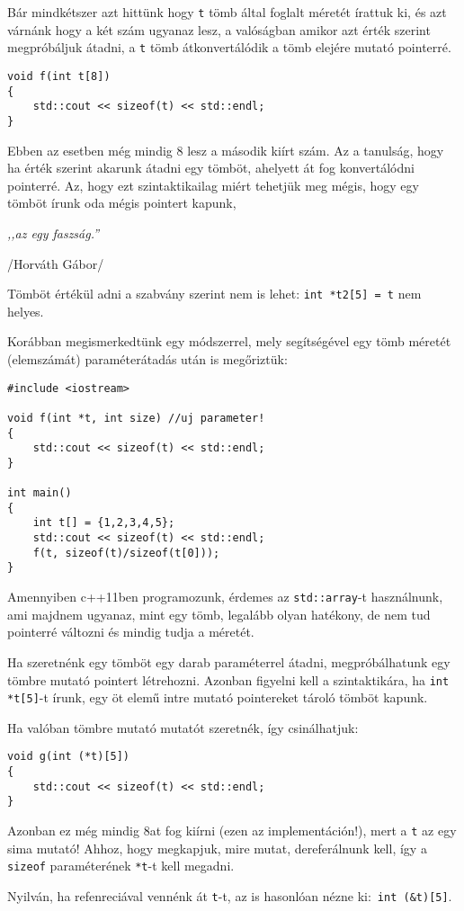 \documentclass[a4paper,11.5pt,table]{article}
\begin{document}
	Bár mindkétszer azt hittünk hogy \texttt{t} tömb által foglalt méretét írattuk ki, és azt várnánk hogy a két szám ugyanaz lesz, a valóságban amikor azt érték szerint megpróbáljuk átadni, a \texttt{t} tömb átkonvertálódik a tömb elejére mutató pointerré.
	\begin{lstlisting}
void f(int t[8])
{
	std::cout << sizeof(t) << std::endl;
}
	\end{lstlisting}
	Ebben az esetben még mindig 8 lesz a második kiírt szám. Az a tanulság, hogy ha érték szerint akarunk átadni egy tömböt, ahelyett át fog konvertálódni pointerré. Az, hogy ezt szintaktikailag miért tehetjük meg mégis, hogy egy tömböt írunk oda mégis pointert kapunk, 
	\begin{center}
		\textit{,,az egy faszság.''}
		
		/Horváth Gábor/
	\end{center}
	\begin{note}
		Tömböt értékül adni a szabvány szerint nem is lehet: \texttt{int *t2[5] = t} nem helyes.
	\end{note}
	Korábban megismerkedtünk egy módszerrel, mely segítségével egy tömb méretét (elemszámát) paraméterátadás után is megőriztük:
	\begin{lstlisting}
#include <iostream>

void f(int *t, int size) //uj parameter!
{
	std::cout << sizeof(t) << std::endl;
}

int main()
{
	int t[] = {1,2,3,4,5};
	std::cout << sizeof(t) << std::endl;
	f(t, sizeof(t)/sizeof(t[0]));
}
	\end{lstlisting}
	\begin{note}
		Amennyiben c++11ben programozunk, érdemes az \texttt{std::array}-t használnunk, ami majdnem ugyanaz, mint egy tömb, legalább olyan hatékony, de nem tud pointerré változni és mindig tudja a méretét.
	\end{note}
	Ha szeretnénk egy tömböt egy darab paraméterrel átadni, megpróbálhatunk egy tömbre mutató pointert létrehozni. Azonban figyelni kell a szintaktikára, ha \texttt{int *t[5]}-t írunk, egy öt elemű intre mutató pointereket tároló tömböt kapunk.
	
	\medskip
	Ha valóban tömbre mutató mutatót szeretnék, így csinálhatjuk:
	\begin{lstlisting}
void g(int (*t)[5])
{
	std::cout << sizeof(t) << std::endl;
}
	\end{lstlisting}
	Azonban ez még mindig 8at fog kiírni (ezen az implementáción!), mert a \texttt{t} az egy sima mutató! Ahhoz, hogy megkapjuk, mire mutat, dereferálnunk kell, így a \texttt{sizeof} paraméterének \texttt{*t}-t kell megadni.
	\begin{note}
		Nyilván, ha refenreciával vennénk át \texttt{t}-t, az is hasonlóan nézne ki:\, \texttt{int (\&t)[5]}.
	\end{note}
	\medskip
	
\end{document}
